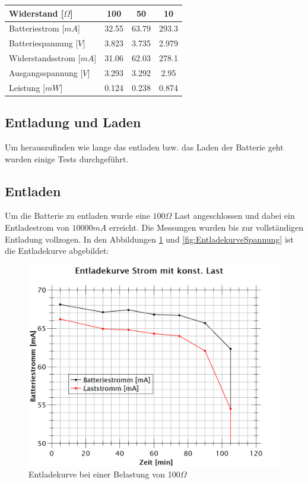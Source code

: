 \begin{table}[hp]
\centering
\label{messungen_Energie}
\begin{tabular}{|l|c|c|c|}
\hline
Widerstand [$\Omega$]     & 100   & 50    & 10    \\ \hline
Batteriestrom [$mA$]    & 32.55 & 63.79 & 293.3 \\ \hline
Batteriespannung [$V$] & 3.823 & 3.735 & 2.979 \\ \hline
Widerstandsstrom [$mA$] & 31.06 & 62.03 & 278.1 \\ \hline
Ausgangsspannung [$V$]  & 3.293 & 3.292 & 2.95  \\ \hline
Leistung [$mW$]  & 0.124 & 0.238 & 0.874  \\ \hline
\end{tabular}
\end{table}

\subsection{Entladung und Laden}

Um herauszufinden wie lange das entladen bzw. das Laden der Batterie geht wurden einige Tests durchgeführt.

\subsection*{Entladen}
Um die Batterie zu entladen wurde eine $100\Omega$ Last angeschlossen und dabei ein Entladestrom von $10000mA$ erreicht. Die Messungen wurden bis zur vollständigen Entladung vollzogen. 
In den Abbildungen \ref{fig:EntladekurveStrom} und \ref{fig:EntladekurveSpannung} ist die Entladekurve abgebildet:

\begin{figure}[htb]
	\centering
	\includegraphics[width=\textwidth]{graphics/EnladekurveStrom.png}
	\caption{Entladekurve bei einer Belastung von 100$\Omega$}
	\label{fig:EntladekurveStrom}
\end{figure}

